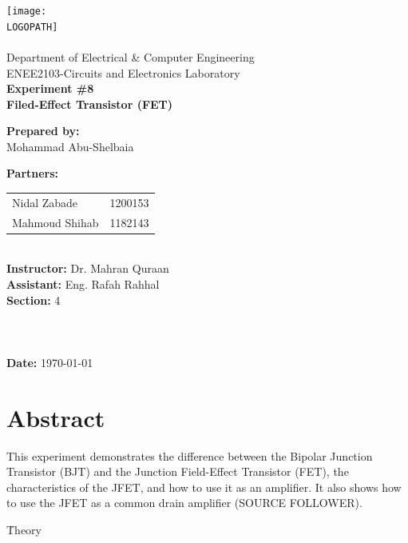 \documentclass[12pt]{article}
\def \LOGOPATH {assets/birzeit-logo.png}
\def \DEPARTEMENT {Department of Electrical \& Computer Engineering}
\def \COURSENUM {ENEE2103}
\def \COURSENAME {Circuits and Electronics Laboratory}
\def \REPORTTITLE {Filed-Effect Transistor (FET)}
\def \STUDENTNAME {Mohammad Abu-Shelbaia}
\def \STUDENTID {1200198}
\def \INSTRUCTOR {Dr. Mahran Quraan}
\def \ASSISTANT {Eng. Rafah Rahhal}
\def \PARTNERAN {Nidal Zabade}
\def \PARTNERBN {Mahmoud Shihab}
\def \PARTNERAID {1200153}
\def \PARTNERBID {1182143}
\def \REPORTNUM {8}
\begin{document}

\begin{titlepage}
    \vfill
    \begin{center}
        \texttt{[image: \\LOGOPATH]} \\
        \hfill \\
        \Large{\DEPARTEMENT} \\
        \Large{\COURSENUM\;-\;\COURSENAME} \\
        \vfill
        \textbf{\LARGE{Experiment \#\REPORTNUM}} \\
        \textbf{\LARGE{\REPORTTITLE}}
    \end{center}
    \vfill
    \begin{flushleft}
        \Large{\textbf{Prepared by:}\\ \STUDENTNAME\quad\STUDENTID} \\
        \Large{\textbf{Partners:}\\ 
        \begin{tabular}{@{}l@{\quad}l}
            \PARTNERAN & \PARTNERAID \\
            \PARTNERBN & \PARTNERBID \\
        \end{tabular}} \\
        \Large{\textbf{Instructor:} \INSTRUCTOR} \\
        \Large{\textbf{Assistant:} \ASSISTANT} \\
        \Large{\textbf{Section:} 4}\\
        \LARGE{\textbf{ }}\\
        \LARGE{\textbf{ }}\\
        \LARGE{\textbf{ }}\\
        \Large{\textbf{Date:} \today}\\
    \end{flushleft}
    \vfill
\end{titlepage}
{
\centering
\section*{Abstract}
This experiment demonstrates the difference between the Bipolar Junction Transistor (BJT) and the Junction Field-Effect Transistor (FET),  the characteristics of the JFET, and how to use it as an amplifier. It also shows how to use the JFET as a common drain amplifier (SOURCE FOLLOWER).
}
\clearpage

\tableofcontents
\clearpage
\setlength{\parskip}{\baselineskip}%
\listoffigures
\clearpage
\listoftables
\clearpage
{}
\h{Theory}
\end{document}
